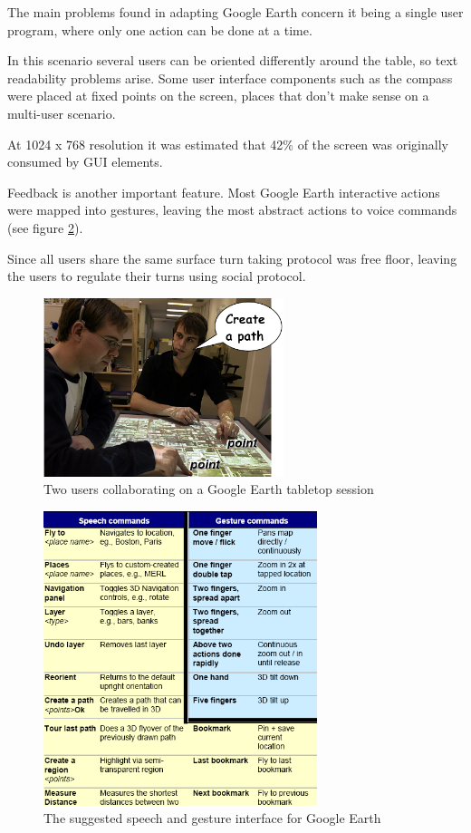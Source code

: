 The main problems found in adapting Google Earth concern it being a single user program, where only
one action can be done at a time.

In this scenario several users can be oriented differently around the table, so text readability problems arise.
Some user interface components such as the compass were placed at fixed points on the screen, places that
don't make sense on a multi-user scenario.

At 1024 x 768 resolution it was estimated that 42\% of the screen was originally consumed by GUI elements.

Feedback is another important feature. Most Google Earth interactive actions were mapped into gestures, leaving
the most abstract actions to voice commands (see figure \ref{FIG-SP-TABLETOP2}).

Since all users share the same surface turn taking protocol was free floor, leaving the users to regulate
their turns using social protocol.

\begin{figure}[!ht]
    \centering
    \includegraphics[width=7cm]{gfx/sp-gest-ttop.png}
    \caption{Two users collaborating on a Google Earth tabletop session}
    \label{FIG-SP-TABLETOP}
\end{figure}

\begin{figure}[!ht]
    \centering
    \includegraphics[width=8cm]{gfx/sp-gest-ttop2.png}
    \caption{The suggested speech and gesture interface for Google Earth}
    \label{FIG-SP-TABLETOP2}
\end{figure}


